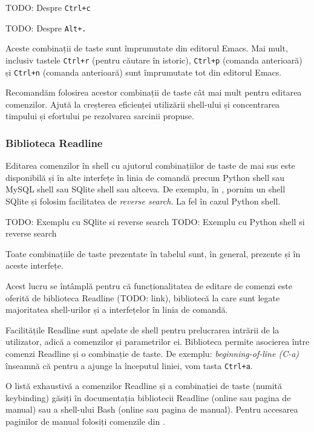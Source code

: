 TODO: Despre \texttt{Ctrl+c}

TODO: Despre \texttt{Alt+.}

Aceste combinații de taste sunt împrumutate din editorul Emacs. Mai mult,
inclusiv tastele \texttt{Ctrl+r} (pentru căutare în istoric), \texttt{Ctrl+p} (comanda anterioară)
și \texttt{Ctrl+n} (comanda anterioară) sunt împrumutate tot din editorul Emacs.

Recomandăm folosirea acestor combinații de taste cât mai mult pentru editarea
comenzilor. Ajută la creșterea eficienței utilizării shell-ului și concentrarea
timpului și efortului pe rezolvarea sarcinii propuse.

\subsubsection{Biblioteca Readline}
\label{sec:cli-readline}

Editarea comenzilor în shell cu ajutorul combinațiilor de taste de mai sus este
disponibilă și în alte interfețe în linia de comandă precum Python shell sau
MySQL shell sau SQlite shell sau altceva. De exemplu, în , pornim un shell
SQlite și folosim facilitatea de \textit{reverse search}. La fel în cazul Python shell.

\begin{screen}[caption={Folosirea reverse search în alte interfețe tip CLI},label={lst:cli:universal-reverse-search}]
TODO: Exemplu cu SQlite si reverse search
TODO: Exemplu cu Python shell si reverse search
\end{screen}

Toate combinațiile de taste prezentate în tabelul  sunt, în general, prezente și în
aceste interfețe.

Acest lucru se întâmplă pentru că funcționalitatea de editare de comenzi este
oferită de biblioteca Readline (TODO: link), bibliotecă la care sunt legate majoritatea
shell-urilor și a interfețelor în linia de comandă.

Facilitățile Readline sunt apelate de shell pentru prelucrarea intrării de la
utilizator, adică a comenzilor și parametrilor ei. Biblioteca permite asocierea
între comenzi Readline și o combinație de taste. De exemplu: \textit{beginning-of-line
(C-a)} înseamnă că pentru a ajunge la începutul liniei, vom tasta \texttt{Ctrl+a}.

O listă exhaustivă a comenzilor Readline și a combinației de taste (numită
keybinding) găsiți în documentația bibliotecii Readline (online sau pagina de
manual) sau a shell-ului Bash (online sau pagina de manual). Pentru accesarea
paginilor de manual folosiți comenzile din .

